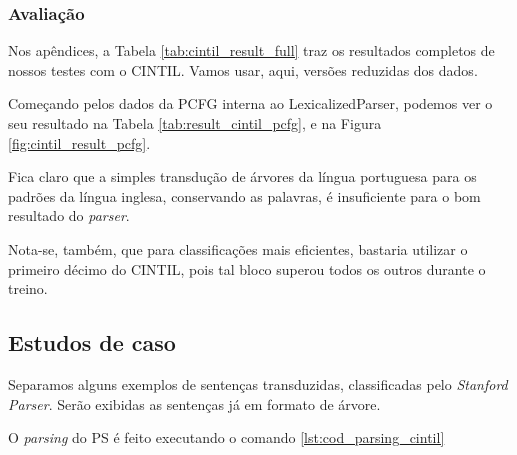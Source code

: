 \subsubsection{Avaliação} \label{result_aval_cintil}
Nos apêndices, a Tabela \ref{tab:cintil_result_full} traz os resultados completos de nossos testes com o CINTIL. Vamos usar, aqui, versões reduzidas dos dados.

Começando pelos dados da PCFG interna ao LexicalizedParser, podemos ver o seu resultado na Tabela \ref{tab:result_cintil_pcfg}, e na Figura \ref{fig:cintil_result_pcfg}.
\begin{center}
    
\end{center}
Fica claro que a simples transdução de árvores da língua portuguesa para os padrões da língua inglesa, conservando as palavras, é insuficiente para o bom resultado do \textit{parser}.

Nota-se, também, que para classificações mais eficientes, bastaria utilizar o primeiro décimo do CINTIL, pois tal bloco superou todos os outros durante o treino.
\begin{center}
    
\end{center}

\subsection{Estudos de caso}
\label{subsec:ec_cintil}
Separamos alguns exemplos de sentenças transduzidas, classificadas pelo \textit{Stanford Parser}. Serão exibidas as sentenças já em formato de árvore. 

O \textit{parsing} do PS é feito executando o comando \ref{lst:cod_parsing_cintil}
\begin{center}
    
\end{center}

